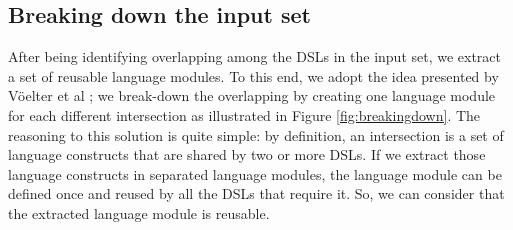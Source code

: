 

\subsection{Breaking down the input set}

After being identifying overlapping among the DSLs in the input set, we extract a set of reusable language modules. To this end, we adopt the idea presented by V\"oelter et al \cite[p. 60-61]{voelter:2013}; we break-down the overlapping by creating one language module for each different intersection as illustrated in Figure \ref{fig:breakingdown}. The reasoning to this solution is quite simple: by definition, an intersection is a set of language constructs that are shared by two or more DSLs. If we extract those language constructs in separated language modules, the language module can be defined once and reused by all the DSLs that require it. So, we can consider that the extracted language module is reusable. 

